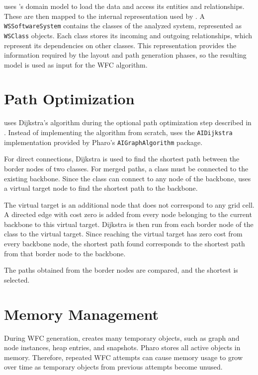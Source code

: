 \documentclass[../../main.tex]{subfiles}
\begin{document}
\wassis uses 's domain model to load the data and access its entities and relationships. These are then mapped to the internal representation used by \wassis. A \texttt{WSSoftwareSystem} contains the classes of the analyzed system, represented as \texttt{WSClass} objects. Each class stores its incoming and outgoing relationships, which represent its dependencies on other classes. This representation provides the information required by the layout and path generation phases, so the resulting model is used as input for the WFC algorithm.




\section{Path Optimization}

\wassis uses Dijkstra's algorithm during the optional path optimization step described in . Instead of implementing the algorithm from scratch, \wassis uses the \texttt{AIDijkstra} implementation provided by Pharo's \texttt{AIGraphAlgorithm} package.

For direct connections, Dijkstra is used to find the shortest path between the border nodes of two classes. For merged paths, a class must be connected to the existing backbone. Since the class can connect to any node of the backbone, \wassis uses a virtual target node to find the shortest path to the backbone.

The virtual target is an additional node that does not correspond to any grid cell. A directed edge with cost zero is added from every node belonging to the current backbone to this virtual target. Dijkstra is then run from each border node of the class to the virtual target. Since reaching the virtual target has zero cost from every backbone node, the shortest path found corresponds to the shortest path from that border node to the backbone.

The paths obtained from the border nodes are compared, and the shortest is selected.

\section{Memory Management}

During WFC generation, \wassis creates many temporary objects, such as graph and node instances, heap entries, and snapshots. Pharo stores all active objects in memory. Therefore, repeated WFC attempts can cause memory usage to grow over time as temporary objects from previous attempts become unused.
\end{document}
